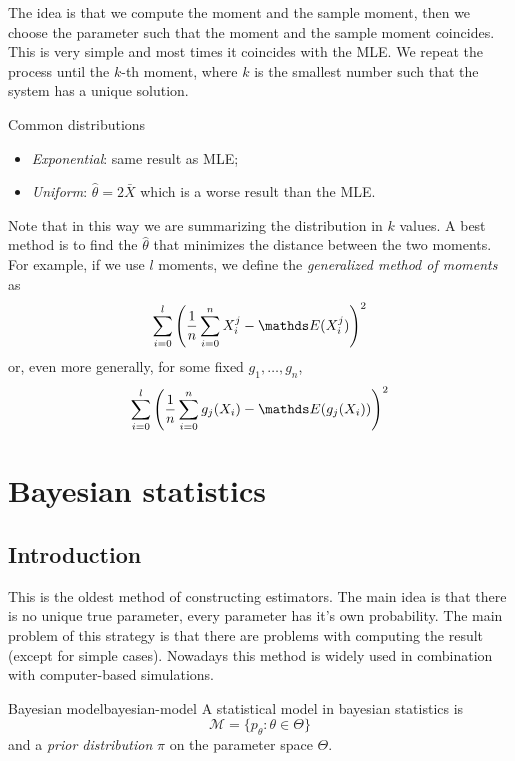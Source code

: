 \documentclass[12pt]{extarticle}
\begin{document}
The idea is that we compute the moment and the sample moment, then we choose the parameter such that the moment and the sample moment coincides.
This is very simple and most times it coincides with the MLE.
We repeat the process until the $k$-th moment, where $k$ is the smallest number such that the system has a unique solution.

\begin{example}{Common distributions}{}
	\begin{itemize}
		\item \emph{Exponential}: same result as MLE;
		\item \emph{Uniform}: $\hat \theta = 2 \bar X$ which is a worse result than the MLE.
	\end{itemize}
\end{example}

Note that in this way we are summarizing the distribution in $k$ values. A best method is to find the $\hat \theta$ that minimizes the distance between the two moments.
For example, if we use $l$ moments, we define the \emph{generalized method of moments} as
\begin{equation}
	\sum_{i = 0}^l \left( \frac{1}{n} \sum_{i = 0}^n X^j_i - \E(X_i^j) \right)^2
\end{equation}
or, even more generally, for some fixed $g_1, \dots, g_n$,
\begin{equation}
	\sum_{i = 0}^l \left( \frac{1}{n} \sum_{i = 0}^n g_j(X_i) - \E(g_j(X_i)) \right)^2
\end{equation}

\section{Bayesian statistics}

\label{sec:bayes}

\subsection{Introduction}

This is the oldest method of constructing estimators.
The main idea is that there is no unique true parameter, every parameter has it's own probability.
The main problem of this strategy is that there are problems with computing the result (except for simple cases).
Nowadays this method is widely used in combination with computer-based simulations.

\begin{definition}{Bayesian model}{bayesian-model}
	A statistical model in bayesian statistics is
	\begin{equation}
		\mathcal M = \{ p_\theta : \theta \in \Theta \}
	\end{equation}
	and a \emph{prior distribution} $\pi$ on the parameter space $\Theta$.
\end{definition}
\end{document}
